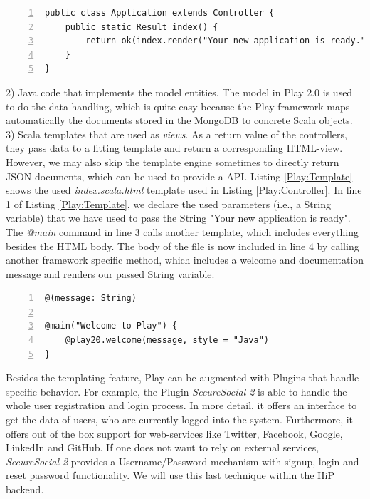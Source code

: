 \begin{lstlisting}[numbers=left,caption={A simple Java controller within the Play Framework.},label=Play:Controller,frame=tlbr,breaklines]
public class Application extends Controller {
    public static Result index() {
        return ok(index.render("Your new application is ready."));
    }
}
\end{lstlisting}

2) Java code that implements the model entities. The model in Play 2.0 is used to do the data handling, which is quite easy because the Play framework maps automatically the documents stored in the MongoDB to concrete Scala objects. \\
3) Scala templates that are used as \textit{views}. As a return value of the controllers, they pass data to a fitting template and return a corresponding \ac{HTML}-view. However, we may also skip the template engine sometimes to directly return \ac{JSON}-documents, which can be used to provide a \ac{API}. Listing \ref{Play:Template} shows the used \textit{index.scala.html} template used in Listing \ref{Play:Controller}. In line 1 of Listing \ref{Play:Template}, we declare the used parameters (i.e., a String variable) that we have used to pass the String "Your new application is ready". The \textit{@main} command in line 3 calls another template, which includes everything besides the \ac{HTML} body. The body of the file is now included in line 4 by calling another framework specific method, which includes a welcome and documentation message and renders our passed String variable.

\begin{lstlisting}[numbers=left,caption={Simple Scala template within the Play Framework.},label=Play:Template,frame=tlbr,breaklines]
@(message: String)

@main("Welcome to Play") {
    @play20.welcome(message, style = "Java")
}
\end{lstlisting}

Besides the templating feature, Play can be augmented with Plugins that handle specific behavior. For example, the Plugin \emph{SecureSocial 2} is able to handle the whole user registration and login process. In more detail, it offers an interface to get the data of users, who are currently logged into the system. Furthermore, it offers out of the box support for web-services like Twitter, Facebook, Google, LinkedIn and GitHub. If one does not want to rely on external services, \emph{SecureSocial 2} provides a Username/Password mechanism with signup, login and reset password functionality. We will use this last technique within the \ac{HiP} backend.

